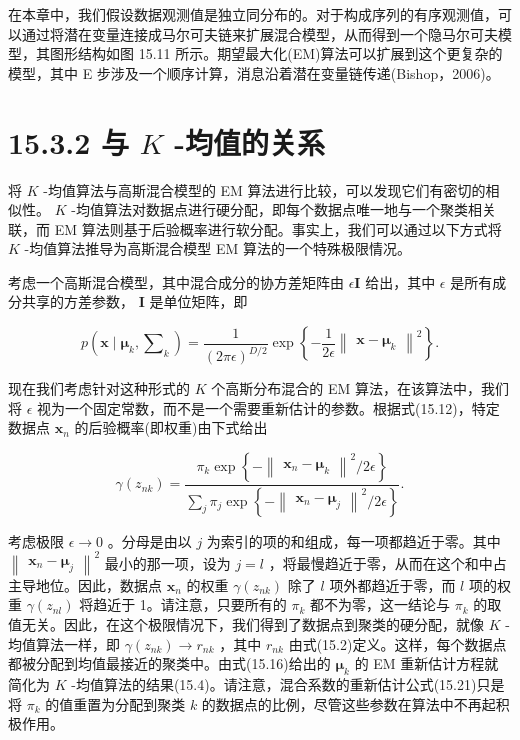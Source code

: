 \documentclass[10pt]{report}
\begin{document}
在本章中，我们假设数据观测值是独立同分布的。对于构成序列的有序观测值，可以通过将潜在变量连接成马尔可夫链来扩展混合模型，从而得到一个隐马尔可夫模型，其图形结构如图 15.11 所示。期望最大化(EM)算法可以扩展到这个更复杂的模型，其中 E 步涉及一个顺序计算，消息沿着潜在变量链传递(Bishop，2006)。

\section*{15.3.2 与 \(K\) -均值的关系}

将 \(K\) -均值算法与高斯混合模型的 EM 算法进行比较，可以发现它们有密切的相似性。 \(K\) -均值算法对数据点进行硬分配，即每个数据点唯一地与一个聚类相关联，而 EM 算法则基于后验概率进行软分配。事实上，我们可以通过以下方式将 \(K\) -均值算法推导为高斯混合模型 EM 算法的一个特殊极限情况。

考虑一个高斯混合模型，其中混合成分的协方差矩阵由 \(\epsilon \mathbf{I}\) 给出，其中 \(\epsilon\) 是所有成分共享的方差参数， \(\mathbf{I}\) 是单位矩阵，即

\[
p\left( {\mathbf{x} \mid  {\mathbf{\mu }}_{k},{\mathbf{\sum }}_{k}}\right)  = \frac{1}{{\left( 2\pi \epsilon \right) }^{D/2}}\exp \left\{  {-\frac{1}{2\epsilon }{\begin{Vmatrix}\mathbf{x} - {\mathbf{\mu }}_{k}\end{Vmatrix}}^{2}}\right\}  . \tag{15.31}
\]

现在我们考虑针对这种形式的 \(K\) 个高斯分布混合的 EM 算法，在该算法中，我们将 \(\epsilon\) 视为一个固定常数，而不是一个需要重新估计的参数。根据式(15.12)，特定数据点 \({\mathbf{x}}_{n}\) 的后验概率(即权重)由下式给出

\[
\gamma \left( {z}_{nk}\right)  = \frac{{\pi }_{k}\exp \left\{  {-{\begin{Vmatrix}{\mathbf{x}}_{n} - {\mathbf{\mu }}_{k}\end{Vmatrix}}^{2}/{2\epsilon }}\right\}  }{\mathop{\sum }\limits_{j}{\pi }_{j}\exp \left\{  {-{\begin{Vmatrix}{\mathbf{x}}_{n} - {\mathbf{\mu }}_{j}\end{Vmatrix}}^{2}/{2\epsilon }}\right\}  }. \tag{15.32}
\]

考虑极限 \(\epsilon  \rightarrow  0\) 。分母是由以 \(j\) 为索引的项的和组成，每一项都趋近于零。其中 \({\begin{Vmatrix}{\mathbf{x}}_{n} - {\mathbf{\mu }}_{j}\end{Vmatrix}}^{2}\) 最小的那一项，设为 \(j = l\) ，将最慢趋近于零，从而在这个和中占主导地位。因此，数据点 \({\mathbf{x}}_{n}\) 的权重 \(\gamma \left( {z}_{nk}\right)\) 除了 \(l\) 项外都趋近于零，而 \(l\) 项的权重 \(\gamma \left( {z}_{nl}\right)\) 将趋近于 1。请注意，只要所有的 \({\pi }_{k}\) 都不为零，这一结论与 \({\pi }_{k}\) 的取值无关。因此，在这个极限情况下，我们得到了数据点到聚类的硬分配，就像 \(K\) -均值算法一样，即 \(\gamma \left( {z}_{nk}\right)  \rightarrow  {r}_{nk}\) ，其中 \({r}_{nk}\) 由式(15.2)定义。这样，每个数据点都被分配到均值最接近的聚类中。由式(15.16)给出的 \({\mathbf{\mu }}_{k}\) 的 EM 重新估计方程就简化为 \(K\) -均值算法的结果(15.4)。请注意，混合系数的重新估计公式(15.21)只是将 \({\pi }_{k}\) 的值重置为分配到聚类 \(k\) 的数据点的比例，尽管这些参数在算法中不再起积极作用。
\end{document}
